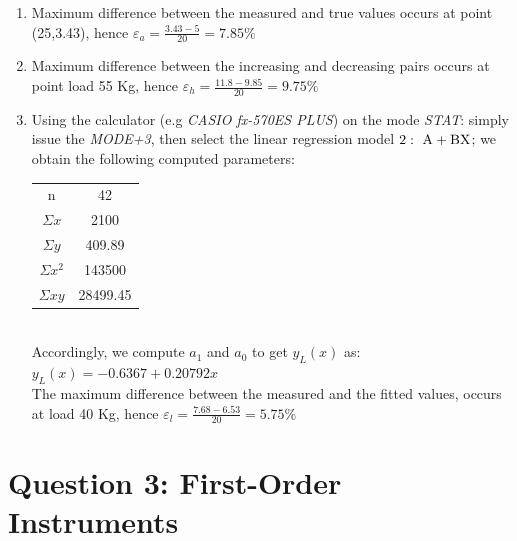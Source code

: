 \documentclass[a4paper,11pt,dvipsnames]{book}
\begin{document}
\begin{solution}
\begin{enumerate}
\item Maximum difference between the measured and true values occurs at point (25,3.43), hence $\varepsilon_a = \frac{3.43-5}{20} = 7.85\%$
\item Maximum difference between the increasing and decreasing pairs occurs at point load 55 Kg, hence $\varepsilon_h = \frac{11.8-9.85}{20} = 9.75\%$
\item 
Using the calculator (e.g \emph{CASIO fx-570ES PLUS}) on the mode \emph{STAT}: simply issue the \emph{MODE+3}, then select the linear regression model $\rm 2:~ A+BX$; we obtain the following computed parameters: \\
\begin{tabular}{|cc|}
 \hline 
 n  & 42 \\ 
 $\Sigma x$ & 2100 \\ 
 $\Sigma y$ & 409.89 \\ 
 $\Sigma x^2$ & 143500 \\ 
 $\Sigma xy$ & 28499.45 \\ 
 \hline 
 \end{tabular}  \\
 Accordingly, we compute $a_1$ and $a_0$ to get $y_L(x)$ as:\\
 $y_L(x) = -0.6367 + 0.20792 x$ \\
 The maximum difference between the measured and the fitted values, occurs at
 load 40 Kg, hence  $\varepsilon_l = \frac{7.68-6.53}{20} = 5.75\%$
\end{enumerate}
\end{solution}

\chapter*{Question 3: First-Order Instruments}
\end{document}
